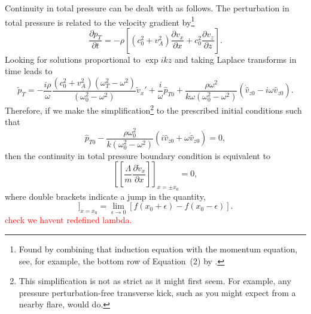 \documentclass[12pt]{../style-files/ociamthesis}
\begin{document}
Continuity in total pressure can be dealt with as follows. The perturbation in total pressure is related to the velocity gradient by\footnote{Found by combining that induction equation with the momentum equation, see, for example, the bottom row of Equation~(2) by \cite{and_etal07}.}
\begin{equation}
\frac{\partial p_T}{\partial t} = -\rho\left[ \left(c_0^2 + v_A^2\right) \frac{\partial v_x}{\partial x} + c_0^2\frac{\partial v_z}{\partial z} \right].
\end{equation}
Looking for solutions proportional to $\exp{ikz}$ and taking Laplace transforms in time leads to
\begin{equation}
\tilde{p}_T = -\frac{i\rho}{\omega} \frac{(c_0^2 + v_A^2)(\omega_T^2 - \omega^2)}{(\omega_0^2 - \omega^2)} \tilde{v}_x' + \frac{i}{\omega} \hat{p}_{T0} + \frac{\rho \omega^2}{k\omega(\omega_0^2 - \omega^2)} \left(\dot{\hat{v}}_{z0} - i\omega\hat{v}_{z0}\right).
\end{equation}
Therefore, if we make the simplification\footnote{This simplification is not as strict as it might first seem. For example, any pressure perturbation-free transverse kick, such as you might expect from a nearby flare, would do.} to the prescribed initial conditions such that
\begin{equation}
\hat{p}_{T0} - \frac{\rho \omega_0^2}{k(\omega_0^2 - \omega^2)} \left(i\hat{v}_{z0} + \omega\dot{\hat{v}}_{z0}\right) = 0,
\end{equation}
then the continuity in total pressure boundary condition is equivalent to
\begin{equation}
\left[ \left[ \frac{\Lambda}{m} \frac{\partial \tilde{v}_x}{\partial x} \right] \right]_{x=\pm x_0} = 0,
\end{equation}
where double brackets indicate a jump in the quantity,
\begin{equation}
[[f]]_{x=x_0} = \lim_{\epsilon \to 0} [f(x_0 + \epsilon) - f(x_0 - \epsilon)].
\end{equation}
\textcolor{red}{check we havent redefined lambda.}
\end{document}
